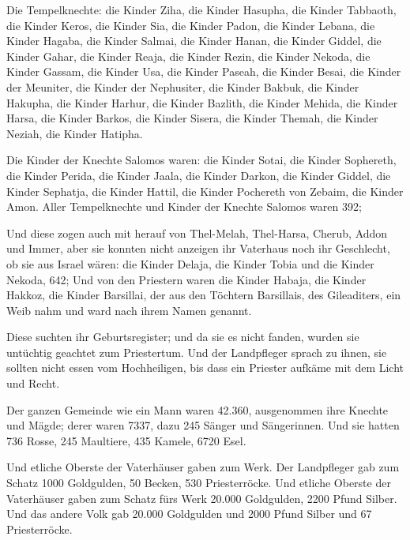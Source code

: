  Die Tempelknechte: die Kinder Ziha, die Kinder Hasupha,
die Kinder Tabbaoth,  die Kinder Keros, die Kinder Sia,
die Kinder Padon,  die Kinder Lebana, die Kinder Hagaba,
die Kinder Salmai,  die Kinder Hanan, die Kinder Giddel,
die Kinder Gahar,  die Kinder Reaja, die Kinder Rezin,
die Kinder Nekoda,  die Kinder Gassam, die Kinder Usa,
die Kinder Paseah,  die Kinder Besai, die Kinder der
Meuniter, die Kinder der Nephusiter,  die Kinder Bakbuk,
die Kinder Hakupha, die Kinder Harhur,  die Kinder
Bazlith, die Kinder Mehida, die Kinder Harsa,  die Kinder
Barkos, die Kinder Sisera, die Kinder Themah,  die Kinder
Neziah, die Kinder Hatipha.

 Die Kinder der Knechte Salomos waren: die Kinder Sotai,
die Kinder Sophereth, die Kinder Perida,  die Kinder
Jaala, die Kinder Darkon, die Kinder Giddel,  die Kinder
Sephatja, die Kinder Hattil, die Kinder Pochereth von Zebaim, die Kinder
Amon.  Aller Tempelknechte und Kinder der Knechte Salomos
waren 392;

 Und diese zogen auch mit herauf von Thel-Melah,
Thel-Harsa, Cherub, Addon und Immer, aber sie konnten nicht anzeigen ihr
Vaterhaus noch ihr Geschlecht, ob sie aus Israel wären: 
die Kinder Delaja, die Kinder Tobia und die Kinder Nekoda, 642;
 Und von den Priestern waren die Kinder Habaja, die
Kinder Hakkoz, die Kinder Barsillai, der aus den Töchtern Barsillais,
des Gileaditers, ein Weib nahm und ward nach ihrem Namen genannt.

 Diese suchten ihr Geburtsregister; und da sie es nicht
fanden, wurden sie untüchtig geachtet zum Priestertum. 
Und der Landpfleger sprach zu ihnen, sie sollten nicht essen vom
Hochheiligen, bis dass ein Priester aufkäme mit dem Licht und Recht.

 Der ganzen Gemeinde wie ein Mann waren 42.360,
 ausgenommen ihre Knechte und Mägde; derer waren 7337,
dazu 245 Sänger und Sängerinnen.  Und sie hatten 736
Rosse, 245 Maultiere,  435 Kamele, 6720 Esel.

 Und etliche Oberste der Vaterhäuser gaben zum Werk. Der
Landpfleger gab zum Schatz 1000 Goldgulden, 50 Becken, 530
Priesterröcke.  Und etliche Oberste der Vaterhäuser gaben
zum Schatz fürs Werk 20.000 Goldgulden, 2200 Pfund Silber.
 Und das andere Volk gab 20.000 Goldgulden und 2000 Pfund
Silber und 67 Priesterröcke.

